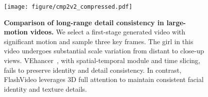 \begin{figure}[!t]
\begin{center}
\texttt{[image: figure/cmp2v2\_compressed.pdf]}
\end{center}
\caption{\textbf{Comparison of long-range detail consistency in large-motion videos. }We select a first-stage generated video with significant motion and sample three key frames. The girl in this video undergoes substantial scale variation from distant to close-up views. VEhancer~\cite{venhancer}, with spatial-temporal module and time slicing, fails to preserve identity and detail consistency. In contrast, FlashVideo leverages 3D full attention to maintain consistent facial identity and texture details. 
}


\label{fig:comp_consis}
\end{figure}




